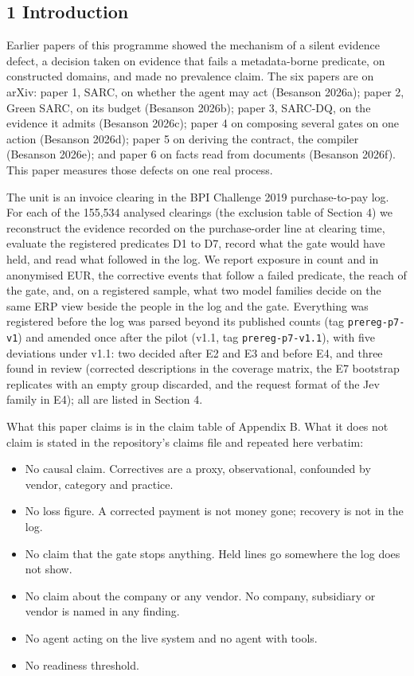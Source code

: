 \documentclass[
  10pt,
]{article}
\providecommand{\tightlist}{%
  \setlength{\itemsep}{0pt}\setlength{\parskip}{0pt}}
\begin{document}
\hypertarget{introduction}{%
\subsection{1 Introduction}\label{introduction}}

Earlier papers of this programme showed the mechanism of a silent
evidence defect, a decision taken on evidence that fails a
metadata-borne predicate, on constructed domains, and made no prevalence
claim. The six papers are on arXiv: paper 1, SARC, on whether the agent
may act (Besanson 2026a); paper 2, Green SARC, on its budget (Besanson
2026b); paper 3, SARC-DQ, on the evidence it admits (Besanson 2026c);
paper 4 on composing several gates on one action (Besanson 2026d); paper
5 on deriving the contract, the compiler (Besanson 2026e); and paper 6
on facts read from documents (Besanson 2026f). This paper measures those
defects on one real process.

The unit is an invoice clearing in the BPI Challenge 2019
purchase-to-pay log. For each of the 155,534 analysed clearings (the
exclusion table of Section 4) we reconstruct the evidence recorded on
the purchase-order line at clearing time, evaluate the registered
predicates D1 to D7, record what the gate would have held, and read what
followed in the log. We report exposure in count and in anonymised EUR,
the corrective events that follow a failed predicate, the reach of the
gate, and, on a registered sample, what two model families decide on the
same ERP view beside the people in the log and the gate. Everything was
registered before the log was parsed beyond its published counts (tag
\texttt{prereg-p7-v1}) and amended once after the pilot (v1.1, tag
\texttt{prereg-p7-v1.1}), with five deviations under v1.1: two decided
after E2 and E3 and before E4, and three found in review (corrected
descriptions in the coverage matrix, the E7 bootstrap replicates with an
empty group discarded, and the request format of the Jev family in E4);
all are listed in Section 4.

What this paper claims is in the claim table of Appendix B. What it does
not claim is stated in the repository's claims file and repeated here
verbatim:

\begin{itemize}
\tightlist
\item
  No causal claim. Correctives are a proxy, observational, confounded by
  vendor, category and practice.
\item
  No loss figure. A corrected payment is not money gone; recovery is not
  in the log.
\item
  No claim that the gate stops anything. Held lines go somewhere the log
  does not show.
\item
  No claim about the company or any vendor. No company, subsidiary or
  vendor is named in any finding.
\item
  No agent acting on the live system and no agent with tools.
\item
  No readiness threshold.
\end{itemize}
\end{document}
